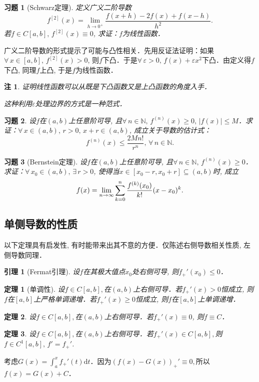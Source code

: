 \documentclass[11pt,a4paper]{ctexart}
\makeatletter
\theoremstyle{thmseries} %
\newtheorem{thm}{定理}[section]
\newtheorem{lem}{引理}[section]
\theoremstyle{exerseries}
\newtheorem{exer}{习题}[section]
\newtheorem*{rem}{注}
\renewenvironment{proof}[1][\proofname]{\par
  \pushQED{\qed}%
  \normalfont \topsep6\p@\@plus6\p@\relax
  \trivlist
  \item[\hskip\labelsep
        \itshape
    #1\@addpunct{}]\ignorespaces
}{%
  \popQED\endtrivlist\@endpefalse
}
\newenvironment{pf}{\begin{proof}[\bfseries\upshape 证\quad]}{\end{proof}}
\newcommand{\bra}[1]{\mathopen{}\left(#1\right)}
\renewcommand{\epsilon}{\varepsilon}
\newcommand{\N}{\mathbb{N}}
\renewcommand{\d}{\mathrm{d}}
\def \nti {\mathnormal{n}\to\infty}
\makeatother
\begin{document}
\begin{exer}[Schwarz定理]
	定义广义二阶导数
	\[f^{[2]}(x)=\lim_{h\to0^+}\frac{f(x+h)-2f(x)+f(x-h)}{h^2}.\]
	若$f\in C[a,b],\,f^{[2]}(x)\equiv0$, 求证：$f$为线性函数．
\end{exer}
\begin{pf}
	广义二阶导数的形式提示了可能与凸性相关．先用反证法证明：如果$\forall\,x\in[a,b],\,f^{[2]}(x)>0$, 则$f$下凸．于是$\forall\,\epsilon>0,\,f(x)+\epsilon x^2$下凸．由定义得$f$下凸, 同理$f$上凸, 于是$f$为线性函数．
\end{pf}
\begin{rem}
	证明线性函数可以从既是下凸函数又是上凸函数的角度入手．
	
	这种利用$\epsilon$处理边界的方式是一种范式．
\end{rem}

\begin{exer}
	设$f$在$(a,b)$上任意阶可导, 且$\forall\,n\in\N,\,f^{(n)}(x)\geq0,\,|f(x)|\leq M$．求证：$\forall\,x\in(a,b),\,r>0,\,x+r\in(a,b)$, 成立关于导数的估计式：
	\[f^{(n)}(x)\leq\frac{2Mn!}{r^n},\,\forall\,n\in\N.\]
\end{exer}

\begin{exer}[Bernstein定理]
	设$f$在$(a,b)$上任意阶可导, 且$\forall\,n\in\N,\,f^{(n)}(x)\geq0$．求证：$\forall\,x_0\in(a,b),\,\exists\,r>0$, 使得当$x\in[x_0-r,x_0+r]\subseteq(a,b)$时, 成立
	\[f(x)=\lim_{\nti}\sum_{k=0}^{n}\frac{f^{(k)}(x_0)}{k!}(x-x_0)^k.\]
\end{exer}


\subsection{单侧导数的性质}
以下定理具有启发性, 有时能带来出其不意的方便．仅陈述右侧导数相关性质, 左侧导数同理．
\begin{lem}[Fermat引理]
	设$f$在其极大值点$x_0$处右侧可导, 则$f_+'(x_0)\leq0$．
\end{lem}

\begin{thm}[单调性]
	设$f\in C[a,b],$在$(a,b)$上右侧可导．若$f_+'(x)>0$恒成立, 则$f$在$[a,b]$上严格单调递增．若$f_+'(x)\geq0$恒成立, 则$f$在$[a,b]$上单调递增．
\end{thm}

\begin{thm}
	设$f\in C[a,b],$在$(a,b)$上右侧可导．若$f_+'(x)\equiv0$, 则$f\equiv C$．
\end{thm}

\begin{thm}
	设$f\in C[a,b],$在$(a,b)$上右侧可导．若$f_+'(x)\in C[a,b],$则$f\in C^1[a,b],\,f'=f_+'$.
\end{thm}
\begin{pf}
	考虑$G(x)=\int_{a}^{x}f_+'(t)\d t$．因为$\bra{f(x)-G(x)}_+'\equiv0,$所以$f(x)=G(x)+C$．
\end{pf}
\end{document}
